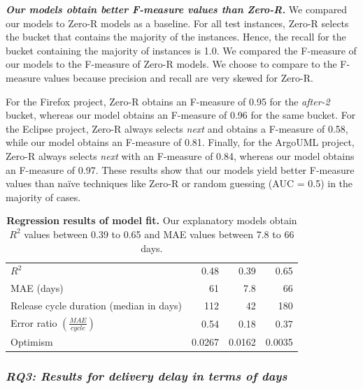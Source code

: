 \noindent\textit{\textbf{Our models obtain better F-measure values than
Zero-R.}} We compared our models to Zero-R models as a baseline. For all test
instances, Zero-R selects the bucket that contains the majority of the instances.
Hence, the recall for the bucket containing the majority of instances is 1.0. We
compared the F-measure of our models to the F-measure of Zero-R models. We
choose to compare to the F-measure values because precision and recall are very
skewed for Zero-R. 

For the Firefox project, Zero-R obtains an F-measure of 0.95 for the
\textit{after-2} bucket, whereas our model obtains an F-measure of 0.96 for the
same bucket. For the Eclipse project, Zero-R always selects \textit{next} and
obtains a F-measure of 0.58, while our model obtains an F-measure of 0.81.
Finally, for the ArgoUML project, Zero-R always selects \textit{next} with an
F-measure of 0.84, whereas our model obtains an F-measure of 0.97. These results
show that our models yield better F-measure values than na\"{i}ve techniques
like Zero-R or random guessing (AUC = 0.5) in the majority of cases.  


\begin{table}
	\centering
	\footnotesize
	\caption{\textbf{Regression results of model fit.} Our explanatory
		models obtain $R^2$ values between 0.39 to 0.65 and MAE values between
	7.8 to 66 days.}
	\label{ch4:tbl:regression_results}
	\def\arraystretch{1.5}
	\begin{tabular}{lrrr}
		\hline 
		\centering{\textbf{Metric/Project}} &
		\centering{\textbf{Eclipse}} & \centering{\textbf{Firefox}} &
		\centering{\textbf{ArgoUML}} \tabularnewline
		\hline 
		$R^2$ & 0.48  & 0.39 & 0.65 \tabularnewline
		\hline 
		MAE (days) & 61 & 7.8  & 66 \tabularnewline
		\hline 
		Release cycle duration (median in days) & 112 & 42 & 180 \tabularnewline
		\hline
		Error ratio $(\frac{MAE}{cycle})$ & 0.54  & 0.18  & 0.37 \tabularnewline
		\hline 
		Optimism & 0.0267 & 0.0162 & 0.0035 \tabularnewline
		\hline 
	\end{tabular}
\end{table}

\subsubsection*{\textit{\textbf{RQ3: Results for delivery delay in terms of days}}}

